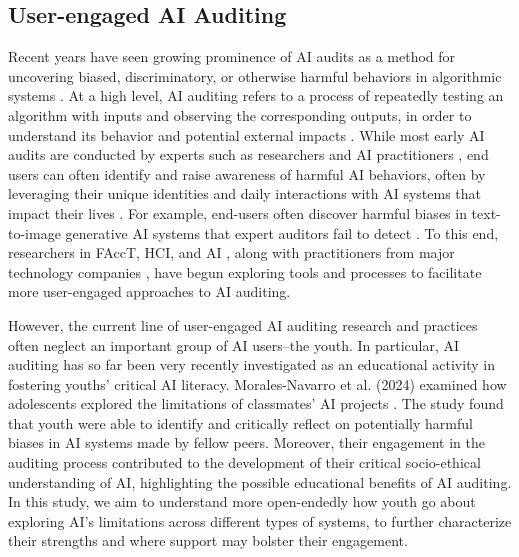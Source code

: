 \subsection{User-engaged AI Auditing}
Recent years have seen growing prominence of AI audits as a method for uncovering biased, discriminatory, or otherwise harmful behaviors in algorithmic systems \cite{noble2018algorithms, asplund2020auditing, sweeney2013discrimination, prates2020assessing, buolamwini2018gender, hannak2014measuring, sandvig2014auditing, metaxa2021auditing, birhane2024ai}. At a high level, AI auditing refers to a process of repeatedly testing an algorithm with inputs and observing the corresponding outputs, in order to understand its behavior and potential external impacts \cite{metaxa2021auditing, birhane2024ai}. While most early AI audits are conducted by experts such as researchers and AI practitioners \cite{cabrera2021discovering, bird2020fairlearn, bellamy2018ai, birhane2024ai}, end users can often identify and raise awareness of harmful AI behaviors, often by leveraging their unique identities and daily interactions with AI systems that impact their lives \cite{deng2023understanding, lam2022enduser, devos2022toward}. For example, end-users often discover harmful biases in text-to-image generative AI systems that expert auditors fail to detect \cite{mack2024they, zhang2024partiality, shelby2024generative}. To this end, researchers in FAccT, HCI, and AI \cite{lam2022enduser, ojewale2024towards, kiela2021dynabench, deng2025weaudit}, along with practitioners from major technology companies \cite{chowdhury2021introducing, HuggingFace, AItest, ChatGPT_Feedback}, have begun exploring tools and processes to facilitate more user-engaged approaches to AI auditing.

However, the current line of user-engaged AI auditing research and practices often neglect an important group of AI users–the youth. In particular, AI auditing has so far been very recently investigated as an educational activity in fostering youths’ critical AI literacy. Morales-Navarro et al. (2024) examined how adolescents explored the limitations of classmates’ AI projects \cite{morales2024youth}. The study found that youth were able to identify and critically reflect on potentially harmful biases in AI systems made by fellow peers. Moreover, their engagement in the auditing process contributed to the development of their critical socio-ethical understanding of AI, highlighting the possible educational benefits of AI auditing. In this study, we aim to understand more open-endedly how youth go about exploring AI’s limitations across different types of systems, to further characterize their strengths and where support may bolster their engagement. %